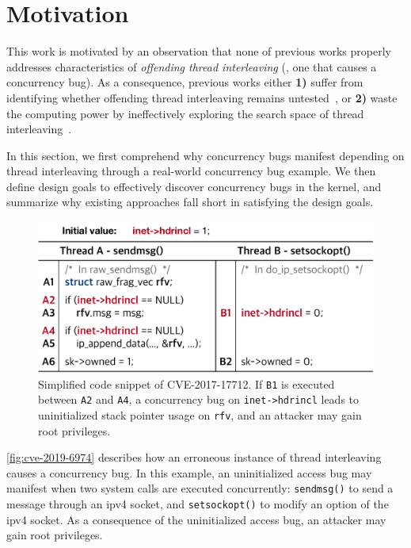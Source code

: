 \section{Motivation}
\label{s:motivation}





%
This work is motivated by an observation that none of previous works
properly addresses characteristics of \textit{offending thread
  interleaving} (\ie, one that causes a concurrency bug).
%
As a consequence, previous works either \textbf{1)} suffer from
identifying whether offending thread interleaving remains
untested~\cite{krace}, or \textbf{2)} waste the computing power by
ineffectively exploring the search space of thread
interleaving~\cite{snowboard, razzer}.


In this section, we first comprehend why concurrency bugs manifest
depending on thread interleaving through a real-world concurrency bug
example.
%
We then define design goals to effectively discover concurrency bugs
in the kernel, and summarize why existing approaches fall short in
satisfying the design goals.


%
\begin{figure}[t]
  \centering
  \includegraphics[width=0.95\linewidth]{fig/cve-2017-10661.pdf}
  \caption{Simplified code snippet of CVE-2017-17712. If \texttt{B1} is
    executed between \texttt{A2} and \texttt{A4}, a concurrency bug on
    \texttt{inet->hdrincl} leads to uninitialized stack pointer usage
    on \texttt{rfv}, and an attacker may gain root privileges.}
  \label{fig:cve-2019-6974}
\end{figure}
%
\autoref{fig:cve-2019-6974} describes how an erroneous instance of
thread interleaving causes a concurrency bug.
%
In this example, an uninitialized access bug may manifest when two
system calls are executed concurrently: \texttt{sendmsg()} to send a
message through an ipv4 socket, and \texttt{setsockopt()} to modify an
option of the ipv4 socket. As a consequence of the uninitialized
access bug, an attacker may gain root privileges.



